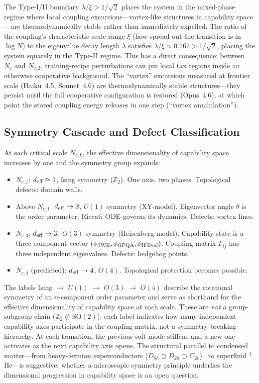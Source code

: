 \documentclass[11pt]{article}
\begin{document}
The Type-I/II boundary $\lambda/\xi > 1/\sqrt{2}$ places the system in the mixed-phase regime where local coupling excursions---vortex-like structures in capability space---are thermodynamically stable rather than immediately expelled.
The ratio of the coupling's characteristic scale-range $\xi$ (how spread out the transition is in $\log N$) to the eigenvalue decay length $\lambda$ satisfies $\lambda/\xi \approx 0.767 > 1/\sqrt{2}$, placing the system squarely in the Type-II regime.
This has a direct consequence: between $N_c$ and $N_{c,2}$, training-recipe perturbations can pin local tax regions inside an otherwise cooperative background.
The ``vortex'' excursions measured at frontier scale (Haiku~4.5, Sonnet~4.6) are thermodynamically stable structures---they persist until the full cooperative configuration is restored (Opus~4.6), at which point the stored coupling energy releases in one step (``vortex annihilation'').

\subsection{Symmetry Cascade and Defect Classification}

At each critical scale $N_{c,k}$, the effective dimensionality of capability space increases by one and the symmetry group expands:
\begin{itemize}
  \item $N_{c,1}$: $d_{\rm eff} \approx 1$, Ising symmetry ($\mathbb{Z}_2$). One axis, two phases. Topological defects: domain walls.
  \item Above $N_{c,1}$: $d_{\rm eff} \to 2$, $U(1)$ symmetry (XY-model). Eigenvector angle $\theta$ is the order parameter; Riccati ODE governs its dynamics. Defects: vortex lines.
  \item $N_{c,3}$: $d_{\rm eff} \to 3$, $O(3)$ symmetry (Heisenberg-model). Capability state is a three-component vector $(\phi_{\rm SWE}, \phi_{\rm GPQA}, \phi_{\rm IFEval})$. Coupling matrix $\Gamma_{ij}$ has three independent eigenvalues. Defects: hedgehog points.
  \item $N_{c,4}$ (predicted): $d_{\rm eff} \to 4$, $O(4)$. Topological protection becomes possible.
\end{itemize}

The labels Ising $\to$ $U(1)$ $\to$ $O(3)$ $\to$ $O(4)$ describe the rotational symmetry of an $n$-component order parameter and serve as shorthand for the effective dimensionality of capability space at each scale.
These are \emph{not} a group-subgroup chain ($\mathbb{Z}_2 \not\subset \mathrm{SO}(2)$); each label indicates how many independent capability axes participate in the coupling matrix, not a symmetry-breaking hierarchy.
At each transition, the previous soft mode stiffens and a new one activates as the next capability axis opens.
The structural parallel to condensed matter---from heavy-fermion superconductors ($D_{6h} \supset D_{2h} \supset C_{2v}$)~\cite{amin2020} to superfluid $^3$He---is suggestive; whether a microscopic symmetry principle underlies the dimensional progression in capability space is an open question.
\end{document}
